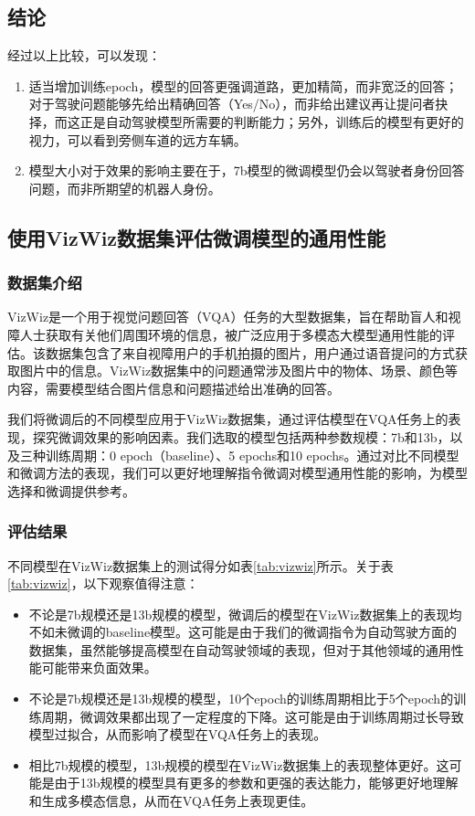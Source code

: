 \documentclass[
    linespread = 1.25
]{ctexart}
\begin{document}
\subsection{结论}

经过以上比较，可以发现：

\begin{enumerate} 
    \item 适当增加训练epoch，模型的回答更强调道路，更加精简，而非宽泛的回答；对于驾驶问题能够先给出精确回答（Yes/No），而非给出建议再让提问者抉择，而这正是自动驾驶模型所需要的判断能力；另外，训练后的模型有更好的视力，可以看到旁侧车道的远方车辆。
    \item 模型大小对于效果的影响主要在于，7b模型的微调模型仍会以驾驶者身份回答问题，而非所期望的机器人身份。
\end{enumerate}

\subsection{使用VizWiz数据集评估微调模型的通用性能}

\subsubsection{数据集介绍}

VizWiz是一个用于视觉问题回答（VQA）任务的大型数据集\cite{gurari2018vizwizgrandchallengeanswering}，旨在帮助盲人和视障人士获取有关他们周围环境的信息，被广泛应用于多模态大模型通用性能的评估。该数据集包含了来自视障用户的手机拍摄的图片，用户通过语音提问的方式获取图片中的信息。VizWiz数据集中的问题通常涉及图片中的物体、场景、颜色等内容，需要模型结合图片信息和问题描述给出准确的回答。

我们将微调后的不同模型应用于VizWiz数据集，通过评估模型在VQA任务上的表现，探究微调效果的影响因素。我们选取的模型包括两种参数规模：7b和13b，以及三种训练周期：0 epoch（baseline）、5 epochs和10 epochs。通过对比不同模型和微调方法的表现，我们可以更好地理解指令微调对模型通用性能的影响，为模型选择和微调提供参考。

\subsubsection{评估结果}

不同模型在VizWiz数据集上的测试得分如表\ref{tab:vizwiz}所示。关于表\ref{tab:vizwiz}，以下观察值得注意：
\begin{itemize}
  \item 不论是7b规模还是13b规模的模型，微调后的模型在VizWiz数据集上的表现均不如未微调的baseline模型。这可能是由于我们的微调指令为自动驾驶方面的数据集，虽然能够提高模型在自动驾驶领域的表现，但对于其他领域的通用性能可能带来负面效果。
  \item 不论是7b规模还是13b规模的模型，10个epoch的训练周期相比于5个epoch的训练周期，微调效果都出现了一定程度的下降。这可能是由于训练周期过长导致模型过拟合，从而影响了模型在VQA任务上的表现。
  \item 相比7b规模的模型，13b规模的模型在VizWiz数据集上的表现整体更好。这可能是由于13b规模的模型具有更多的参数和更强的表达能力，能够更好地理解和生成多模态信息，从而在VQA任务上表现更佳。
\end{itemize}
\end{document}
